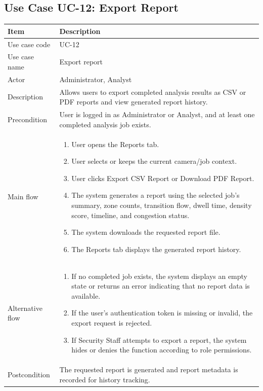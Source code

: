 \documentclass[12pt,a4paper]{report}
\begin{document}
\subsection{Use Case UC-12: Export Report}
\begin{longtable}{|p{3.6cm}|p{10.4cm}|}
\hline
\rowcolor{HeaderBlue}\textbf{Item} & \textbf{Description} \\
\hline
Use case code & UC-12 \\
\hline
Use case name & Export report \\
\hline
Actor & Administrator, Analyst \\
\hline
Description & Allows users to export completed analysis results as CSV or PDF reports and view generated report history. \\
\hline
Precondition & User is logged in as Administrator or Analyst, and at least one completed analysis job exists. \\
\hline
Main flow &
\begin{enumerate}
    \item User opens the Reports tab.
    \item User selects or keeps the current camera/job context.
    \item User clicks Export CSV Report or Download PDF Report.
    \item The system generates a report using the selected job's summary, zone counts, transition flow, dwell time, density score, timeline, and congestion status.
    \item The system downloads the requested report file.
    \item The Reports tab displays the generated report history.
\end{enumerate} \\
\hline
Alternative flow &
\begin{enumerate}
    \item If no completed job exists, the system displays an empty state or returns an error indicating that no report data is available.
    \item If the user's authentication token is missing or invalid, the export request is rejected.
    \item If Security Staff attempts to export a report, the system hides or denies the function according to role permissions.
\end{enumerate} \\
\hline
Postcondition & The requested report is generated and report metadata is recorded for history tracking. \\
\hline
\end{longtable}
\end{document}
